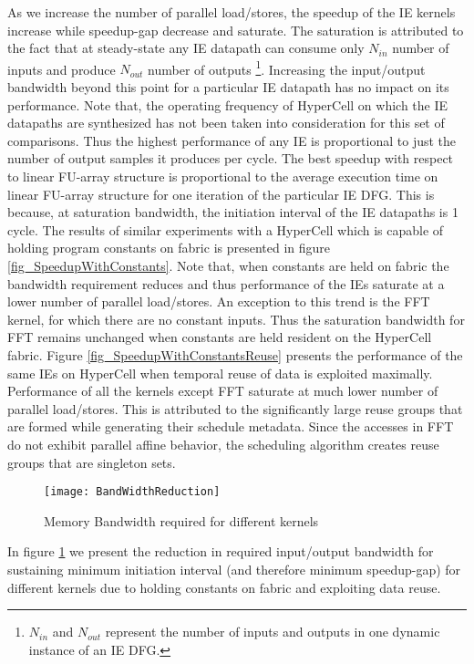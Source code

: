 As we increase the number of parallel load/stores, the speedup of the IE kernels increase while speedup-gap decrease and saturate. The saturation is attributed to the fact that at steady-state any IE datapath can consume only $N_{in}$  number of inputs and produce $N_{out}$ number of outputs \footnote{$N_{in}$ and $N_{out}$ represent the number of inputs and outputs in one dynamic instance of an IE DFG.}. Increasing the input/output bandwidth beyond this point for a particular IE datapath has no impact on its performance. Note that, the operating frequency of HyperCell on which the IE datapaths are synthesized has not been taken into consideration for this set of comparisons. Thus the highest performance of any IE is proportional to just the number of output samples it produces per cycle. The best speedup with respect to linear FU-array structure is proportional to the average execution time on linear FU-array structure for one iteration of the particular IE DFG. This is because, at saturation bandwidth, the initiation interval of the IE datapaths is 1 cycle. The results of similar experiments with a HyperCell which is capable of holding program constants on fabric is presented in figure \ref{fig_SpeedupWithConstants}. Note that, when constants are held on fabric the bandwidth requirement reduces and thus performance of the IEs saturate at a lower number of parallel load/stores. An exception to this trend is the FFT kernel, for which there are no constant inputs. Thus the saturation bandwidth for FFT remains unchanged when constants are held resident on the HyperCell fabric. Figure \ref{fig_SpeedupWithConstantsReuse} presents the performance of the same IEs on HyperCell when temporal reuse of data is exploited maximally. Performance of all the kernels except FFT saturate at much lower number of parallel load/stores. This is attributed to the significantly large reuse groups that are formed while generating their schedule metadata. Since the accesses in FFT do not exhibit parallel affine behavior, the scheduling algorithm creates reuse groups that are singleton sets. 
\begin{figure}[!h]
  \centering
    \texttt{[image: BandWidthReduction]}
    \caption{Memory Bandwidth required for different kernels}
\label{fig_BandWidthReduction}
\end{figure}
In figure \ref{fig_BandWidthReduction} we present the reduction in required input/output bandwidth for sustaining minimum initiation interval (and therefore minimum speedup-gap) for different kernels due to holding constants on fabric and exploiting data reuse.
